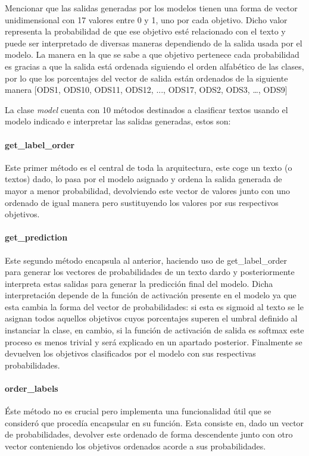 Mencionar que las salidas generadas por los modelos tienen una forma de vector
unidimensional con 17 valores entre 0 y 1, uno por cada objetivo. Dicho valor
representa la probabilidad de que ese objetivo esté relacionado con el texto y
puede ser interpretado de diversas maneras dependiendo de la salida usada por el
modelo. La manera en la que se sabe a que objetivo pertenece cada probabilidad
es gracias a que la salida está ordenada siguiendo el orden alfabético de las
clases, por lo que los porcentajes del vector de salida están ordenados de la
siguiente manera [ODS1, ODS10, ODS11, ODS12, ..., ODS17, ODS2, ODS3, …, ODS9]

La clase \textit{model} cuenta con 10 métodos destinados a clasificar textos usando el
modelo indicado e interpretar las salidas generadas, estos son: 

\paragraph{get\_label\_order}
Este primer método es el central de toda la arquitectura, este coge un texto (o
textos)  dado, lo pasa por el modelo asignado y ordena la salida generada de
mayor a menor probabilidad, devolviendo este vector de valores junto con uno
ordenado de igual manera pero sustituyendo los valores por sus respectivos
objetivos.

\paragraph{get\_prediction} Este segundo método encapsula al anterior, haciendo uso de
get\_label\_order para generar los vectores de probabilidades de un texto dardo y
posteriormente interpreta estas salidas para generar la predicción final del
modelo. Dicha interpretación depende de la función de activación presente en el
modelo ya que esta cambia la forma del vector de probabilidades: si esta es
sigmoid al texto se le asignan todos aquellos objetivos cuyos porcentajes
superen el umbral definido al instanciar la clase, en cambio, si la función de
activación de salida es softmax este proceso es menos trivial y será explicado
en un apartado posterior. Finalmente se devuelven los objetivos clasificados por
el modelo con sus respectivas probabilidades.

\paragraph{order\_labels} Éste método no es crucial pero implementa una funcionalidad útil
que se consideró que procedía encapsular en su función. Esta consiste en, dado
un vector de probabilidades, devolver este ordenado de forma descendente junto
con otro vector conteniendo los objetivos ordenados acorde a sus probabilidades. 

